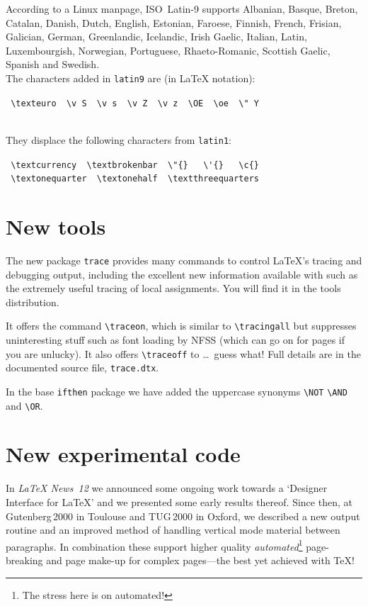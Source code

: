 \documentclass{ltnews}
\providecommand\pkg[1]{\texttt{#1}}
\providecommand\option[1]{\texttt{#1}}
\providecommand\file[1]{\texttt{#1}}
\begin{document}
According to a Linux manpage, ISO~Latin-9 supports Albanian, Basque,
Breton, Catalan, Danish, Dutch, English, Estonian, Faroese, Finnish,
French, Frisian, Galician, German, Greenlandic, Icelandic, Irish
Gaelic, Italian, Latin, Luxembourgish, Norwegian, Portuguese,
Rhaeto-Romanic, Scottish Gaelic, Spanish and Swedish.\\
The characters added in \option{latin9} are (in \LaTeX{} notation):\\
\begin{small}
\verb| \texteuro  \v S  \v s  \v Z  \v z  \OE  \oe  \" Y |
\end{small}\\
They displace the following characters from \option{latin1}:\\
\begin{small}
\verb| \textcurrency  \textbrokenbar  \"{}   \'{}   \c{} |\\
\verb| \textonequarter  \textonehalf  \textthreequarters |
\end{small}


\section{New tools}

The new package \pkg{trace} provides many commands to control
\LaTeX{}'s tracing and debugging output, including the excellent new
information available with \eTeX{} such as the extremely useful
tracing of local assignments.  You will find it in the tools
distribution.

It offers the command \verb|\traceon|, which is similar to
\verb|\tracingall| but suppresses uninteresting stuff such as font
loading by NFSS (which can go on for pages if you are unlucky).  It
also offers \verb|\traceoff| to \ldots\ guess what!  Full details are
in the documented source file, \file{trace.dtx}.

In the base \pkg{ifthen} package we have added
the uppercase synonyms \verb|\NOT| \verb|\AND| and \verb|\OR|.

\section{New experimental code}

In \textit{\LaTeX{} News~12} we announced some ongoing work towards a
`Designer Interface for \LaTeX' and we presented some early results
thereof.  Since then, at Gutenberg\,2000 in Toulouse and TUG\,2000 in
Oxford, we described a new output routine and an improved method of
handling vertical mode material between paragraphs.  In combination
these support higher quality \emph{automated}\footnote
                             {The stress here is on automated!}
page-breaking and page make-up\latex{\\}
for complex pages---the best yet achieved with \TeX{}!
\end{document}
